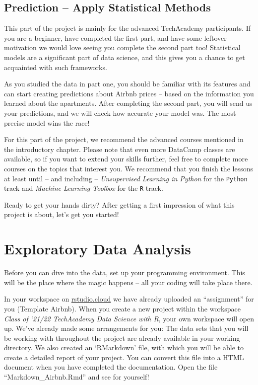 \documentclass[
  11pt,
]{article}
\newenvironment{tips}[1]
  {
  \begin{itemize}
  \footnotesize
  \renewcommand{\labelitemi}{
    \raisebox{-.7\height}[0pt][0pt]{
      {\setkeys{Gin}{width=3em,keepaspectratio}
        \texttt{[image: images/\#1.png]}}
    }
  }
  \setlength{\fboxsep}{1em}
  \begin{rbox}
  \item
  }
  {
  \end{rbox}
  \end{itemize}
  }
\begin{document}
\hypertarget{prediction-apply-statistical-methods}{%
\subsection{Prediction -- Apply Statistical Methods}\label{prediction-apply-statistical-methods}}

This part of the project is mainly for the advanced TechAcademy participants. If you are a beginner, have completed the first part, and have some leftover motivation we would love seeing you complete the second part too!
Statistical models are a significant part of data science, and this gives you a chance to get acquainted with such frameworks.

As you studied the data in part one, you should be familiar with its features and can start creating predictions about Airbnb prices -- based on the information you learned about the apartments. After completing the second part, you will send us your predictions, and we will check how accurate your model was. The most precise model wins the race!

For this part of the project, we recommend the advanced courses mentioned in the introductory chapter. Please note that even more DataCamp classes are available, so if you want to extend your skills further, feel free to complete more courses on the topics that interest you. We recommend that you finish the lessons at least until -- and including -- \emph{Unsupervised Learning in Python} for the \texttt{Python} track and \emph{Machine Learning Toolbox} for the \texttt{R} track.

Ready to get your hands dirty? After getting a first impression of what this project is about, let's get you started!

\newpage

\hypertarget{exploratory-data-analysis}{%
\section{Exploratory Data Analysis}\label{exploratory-data-analysis}}

Before you can dive into the data, set up your programming environment. This will be the place where the magic happens -- all your coding will take place there.

\begin{tips}r
In your workspace on \href{https://rstudio.cloud/projects}{rstudio.cloud} we have already uploaded an ``assignment'' for you (Template Airbnb). When you create a new project within the workspace \emph{Class of '21/22 \textbar{} TechAcademy \textbar{} Data Science with R}, your own workspace will open up. We've already made some arrangements for you: The data sets that you will be working with throughout the project are already available in your working directory. We also created an `RMarkdown' file, with which you will be able to create a detailed report of your project. You can convert this file into a HTML document when you have completed the documentation. Open the file ``Markdown\_Airbnb.Rmd'' and see for yourself!

\end{tips}
\end{document}
